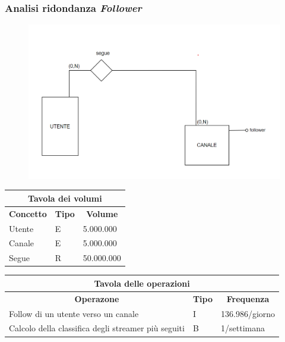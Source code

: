 \subsubsection*{Analisi ridondanza \textit{Follower}}
\begin{figure}[h]
    \centering
    \includegraphics[scale = 0.5]{img/ridondanza1.png}
\end{figure}
\begin{center}
\begin{tabular}{|p{5cm}|p{5cm}|p{5cm}|}
\hline
\multicolumn{3}{|c|}{\textbf{Tavola dei volumi}}\\
\hline
 \multicolumn{1}{|c|}{\textbf{Concetto}} 
 & \multicolumn{1}{|c|}{\textbf{Tipo}}
 & \multicolumn{1}{|c|}{\textbf{Volume}}\\
  \hline
  Utente& E & 5.000.000\\
  \hline
  Canale & E & 5.000.000\\
 \hline 
  Segue & R & 50.000.000\\
 \hline
\end{tabular}
\end{center}
\begin{center}
\begin{tabular}{|p{5cm}|p{5cm}|p{5cm}|}
\hline
\multicolumn{3}{|c|}{\textbf{Tavola delle operazioni}}\\
\hline
 \multicolumn{1}{|c|}{\textbf{Operazone}} 
 & \multicolumn{1}{|c|}{\textbf{Tipo}}
 & \multicolumn{1}{|c|}{\textbf{Frequenza}}\\
  \hline
  Follow di un utente verso un canale & I & 136.986/giorno\\
  \hline
  Calcolo della classifica degli streamer più seguiti & B & 1/settimana\\
 \hline
\end{tabular}
\end{center}



